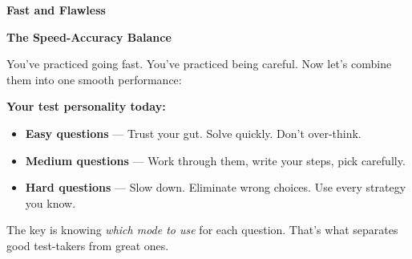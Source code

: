 \clearpage
\thispagestyle{empty}
{\sffamily

\begin{center}
{\fontsize{22}{26}\selectfont\bfseries\color{funPurple} \faBolt\hspace{3mm}Fast and Flawless\hspace{3mm}\faBolt}

\vspace{2mm}
{\color{funGray}\hrulefill}
\end{center}

\vspace{3mm}

\begin{tcolorbox}[
    enhanced,
    colback=funPurpleLight,
    colframe=funPurple!50,
    arc=10pt,
    boxrule=1.5pt,
    left=6mm, right=6mm, top=5mm, bottom=5mm,
]
{\large\bfseries\color{funPurpleDark} \faBalanceScaleLeft\hspace{2mm}The Speed-Accuracy Balance}

\vspace{2mm}

You've practiced going fast. You've practiced being careful. Now let's combine them into one smooth performance:

\vspace{3mm}

\textbf{Your test personality today:}

\vspace{2mm}

\begin{itemize}[leftmargin=6mm, itemsep=3pt]
    \item[\textcolor{funPurple}{\faBolt}] \textbf{Easy questions} — Trust your gut. Solve quickly. Don't over-think.
    \item[\textcolor{funPurple}{\faEye}] \textbf{Medium questions} — Work through them, write your steps, pick carefully.
    \item[\textcolor{funPurple}{\faShieldAlt}] \textbf{Hard questions} — Slow down. Eliminate wrong choices. Use every strategy you know.
\end{itemize}

\vspace{2mm}

The key is knowing \textit{which mode to use} for each question. That's what separates good test-takers from great ones.
\end{tcolorbox}

\vspace{3mm}

}
